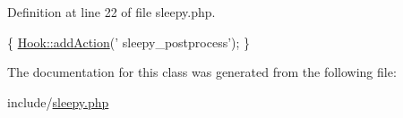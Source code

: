 Definition at line 22 of file sleepy.\-php.


\begin{DoxyCode}
                                                           \{
                                             \hyperlink{class_hook_afff7a7869d2dd304043b69a3fff24655}{Hook::addAction}(\textcolor{stringliteral}{'
      sleepy\_postprocess'});
                              \}
\end{DoxyCode}


The documentation for this class was generated from the following file\-:\begin{DoxyCompactItemize}
\item 
include/\hyperlink{sleepy_8php}{sleepy.\-php}\end{DoxyCompactItemize}
